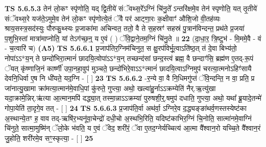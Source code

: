 \documentclass[17pt]{extarticle}
\begin{document}
                  \newline
                                \textbf{ TS 5.6.5.3} \newline
                  तेन॑ लो॒कꣳ स्पृ॑णोति॒ यद् द्वि॒तीये॑ संॅवथ्स॒रे᳚ऽग्निं चि॑नु॒ते᳚ ऽन्तरि॑क्षमे॒व तेन॑ स्पृणोति॒ यत् तृ॒तीये॑ संॅवथ्स॒रे यज॑ते॒ऽमुमे॒व तेन॑ लो॒कꣳ स्पृ॑णोत्ये॒तं ॅवै पर॑ आट्णा॒रः क॒क्षीवाꣳ॑ औशि॒जो वी॒तह॑व्यः श्राय॒सस्त्र॒सद॑स्युः पौरुकु॒थ्स्यः प्र॒जाका॑मा अचिन्वत॒ ततो॒ वै ते स॒हस्रꣳ॑ सहस्रं पु॒त्रान॑विन्दन्त॒ प्रथ॑ते प्र॒जया॑ प॒शुभि॒स्तां मात्रा॑माप्नोति॒ यां तेऽग॑च्छ॒न्॒ य ए॒वं ( ) ॅवि॒द्वाने॒तम॒ग्निं चि॑नु॒ते ॥ \textbf{  22} \newline
                  \newline
                      (दा॒धा॒र॒ त्रि॒ष्टुभ॑ - मि॒ममे॒वै - वं - च॒त्वारि॑ च)  \textbf{(A5)} \newline \newline
                                        \textbf{ TS 5.6.6.1} \newline
                  प्र॒जाप॑तिर॒ग्निम॑चिनुत॒ स क्षु॒रप॑विर्भू॒त्वाऽति॑ष्ठ॒त् तं दे॒वा बिभ्य॑तो॒ नोपा॑ऽऽ*य॒न् ते छन्दो॑भिरा॒त्मानं॑ छादयि॒त्वोपा॑ऽऽ*य॒न् तच्छन्द॑सां छन्द॒स्त्वं ब्रह्म॒ वै छन्दाꣳ॑सि॒ ब्रह्म॑ण ए॒तद्-रू॒पं ॅयत् कृ॑ष्णाजि॒नं कार्ष्णी॑ उपा॒नहा॒वुप॑ मुञ्चते॒ छन्दो॑भिरे॒वाऽऽ*त्मानं॑ छादयि॒त्वाऽग्निमुप॑ चरत्या॒त्मनोऽहिꣳ॑सायै देवनि॒धिर्वा ए॒ष नि धी॑यते॒ यद॒ग्नि - [  ] \textbf{  23} \newline
                  \newline
                                \textbf{ TS 5.6.6.2} \newline
                  -र॒न्ये वा॒ वै नि॒धिमगु॑प्तं ॅवि॒न्दन्ति॒ न वा॒ प्रति॒ प्र जा॑नात्यु॒खामा क्रा॑मत्या॒त्मान॑मे॒वाधि॒पां कु॑रुते॒ गुप्त्या॒ अथो॒ खल्वा॑हु॒र्नाऽऽक्रम्येति॑ नैर्.ऋ॒त्यु॑खा यदा॒क्रामे॒न्निर्.ऋ॑त्या आ॒त्मान॒मपि॑ दद्ध्या॒त् तस्मा॒न्नाऽऽक्रम्या॑ पुरुषशी॒र्॒.षमुप॑ दधाति॒ गुप्त्या॒ अथो॒ यथा᳚ ब्रू॒यादे॒तन्मे॑ गोपा॒येति॑ ता॒दृगे॒व तत् - [  ] \textbf{  24} \newline
                  \newline
                                \textbf{ TS 5.6.6.3} \newline
                  प्र॒जाप॑ति॒र्वा अथ॑र्वा॒ ऽग्निरे॒व द॒द्ध्यङ्ङा॑थर्व॒णस्तस्येष्ट॑का अ॒स्थान्ये॒तꣳ ह॒ वाव तद्-ऋषि॑र॒भ्यनू॑वा॒चेन्द्रो॑ दधी॒चो अ॒स्थभि॒रिति॒ यदिष्ट॑काभिर॒ग्निं चि॒नोति॒ सात्मा॑नमे॒वाग्निं चि॑नुते॒ सात्मा॒मुष्मि॑न् ॅलो॒के भ॑वति॒ य ए॒वं ॅवेद॒ शरी॑रं॒ ॅवा ए॒तद॒ग्नेर्यच्चित्य॑ आ॒त्मा वै᳚श्वान॒रो यच्चि॒ते वै᳚श्वान॒रं जु॒होति॒ शरी॑रमे॒व सꣳ॒॒स्कृत्या॒ - [  ] \textbf{  25} \newline
\end{document}
